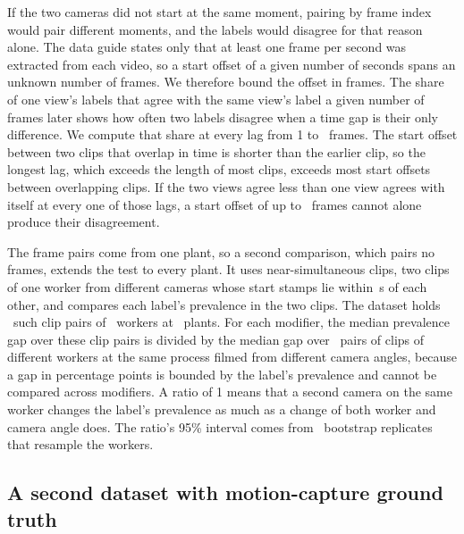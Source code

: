 \documentclass[review,3p,authoryear]{elsarticle}
\begin{document}
If the two cameras did not start at the same
moment, pairing by frame index would pair different moments, and the labels would disagree
for that reason alone. The data guide
states only that at least one frame per second was extracted from each video, so a start
offset of a given number of seconds spans an unknown number of frames. We therefore bound
the offset in frames. The share of one
view's labels that agree with the same view's label a given number of frames later shows
how often two labels disagree when a time gap is their only difference. We compute that
share at every lag from 1 to \xviewLagMax\ frames. The start offset between two clips that overlap in
time is shorter than the earlier clip, so the longest lag, which exceeds the length of
most clips, exceeds most start offsets between overlapping clips.
If the two views agree less than one view agrees with itself at every one of those lags, a
start offset of up to \xviewLagMax\ frames cannot alone produce their disagreement.

The frame pairs come from one plant, so a second comparison, which pairs no frames,
extends the test to every plant. It uses near-simultaneous
clips, two clips of one worker from different cameras whose start stamps lie within
\takePairDt\,s of each other, and compares each label's prevalence in the two clips. The dataset holds \nTakePairs\ such clip pairs of \nTakePairWorkers\ workers
at \nTakePairFactories\ plants. For each modifier, the median prevalence gap over these
clip pairs is divided by the median gap over \nNullPairs\ pairs of clips of different
workers at the same process filmed from different camera angles, because a gap in
percentage points is bounded by the label's prevalence and cannot be compared across
modifiers. A ratio of 1 means that a second camera on the same worker changes the label's prevalence
as much as a change of both worker and camera angle does. The ratio's 95\% interval comes from \nBoot\ bootstrap
replicates that resample the workers.

\subsection{A second dataset with motion-capture ground truth}
\label{met:andy}
\end{document}
